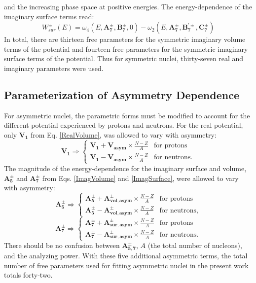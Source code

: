 \documentclass[twocolumn,secnumarabic,amssymb, nobibnotes, aps, prl,
superscriptaddress, nobalancelastpage, draft]{revtex4}
\begin{document}
and the increasing phase space at positive energies.
The energy-dependence of the imaginary surface terms read:
\begin{equation} \label{ImagSurface}
    W_{sur}^{\pm}(E) = \omega_{4}(E, \mathbf{A_{7}^{\pm}}, \mathbf{B_{7}^{\pm}}, 0)
    - \omega_{2}(E, \mathbf{A_{7}^{\pm}}, \mathbf{B_{7}^{'\pm}}, \mathbf{C_{7}^{\pm}})
\end{equation}
In total, there are
thirteen free parameters for the symmetric imaginary volume terms of the
potential and fourteen free parameters for the symmetric imaginary surface terms
of the potential. Thus for symmetric nuclei, thirty-seven real and imaginary
parameters were used.

\subsection{Parameterization of Asymmetry Dependence}
For asymmetric nuclei,
the parametric forms must be modified to account for the different potential experienced by 
protons and neutrons. For the real potential, only $\mathbf{V_{1}}$ from Eq. \ref{RealVolume},
was allowed to vary with asymmetry:
\begin{equation}
    \mathbf{V_{1}} \Rightarrow \begin{cases}
        \mathbf{V_{1}} + \mathbf{V_{asym}}\times\frac{N-Z}{A} & \text{for protons}\\
        \mathbf{V_{1}} - \mathbf{V_{asym}}\times\frac{N-Z}{A} & \text{for neutrons}.
    \end{cases}
\end{equation}
The magnitude of the energy-dependence for the imaginary surface and volume,
$\mathbf{A_{5}^{\pm}}$ and $\mathbf{A_{7}^{\pm}}$ from Eqs. \ref{ImagVolume} and \ref{ImagSurface},
were allowed to vary with asymmetry:
\begin{equation}
    \mathbf{A_{5}^{\pm}} \Rightarrow \begin{cases}
        \mathbf{A_{5}^{\pm}} + \mathbf{A_{vol, asym}^{\pm}}\times\frac{N-Z}{A} & \text{for protons}\\
        \mathbf{A_{5}^{\pm}} - \mathbf{A_{vol, asym}^{\pm}}\times\frac{N-Z}{A} & \text{for neutrons},
    \end{cases}
\end{equation}
\begin{equation}
    \mathbf{A_{7}^{\pm}} \Rightarrow \begin{cases}
        \mathbf{A_{7}^{\pm}} + \mathbf{A_{sur, asym}^{\pm}}\times\frac{N-Z}{A} & \text{for protons}\\
        \mathbf{A_{7}^{\pm}} - \mathbf{A_{sur, asym}^{\pm}}\times\frac{N-Z}{A} & \text{for neutrons}.
    \end{cases}
\end{equation}
There should be no confusion between $\mathbf{A_{5,7}^{\pm}}$, $A$ (the total number
of nucleons), and the analyzing power. 
With these five additional asymmetric terms,
the total number of free parameters used for
fitting asymmetric nuclei in the present work totals forty-two.
\end{document}
